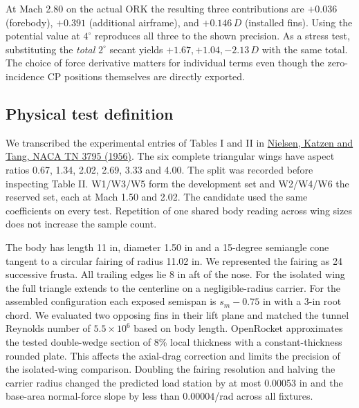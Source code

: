 At Mach 2.80 on the actual ORK the resulting three contributions are $+0.036$ (forebody), $+0.391$ (additional airframe), and $+0.146\,D$ (installed fins). Using the potential value at $4^\circ$ reproduces all three to the shown precision. As a stress test, substituting the \emph{total} $2^\circ$ secant yields $+1.67,+1.04,-2.13\,D$ with the same total. The choice of force derivative matters for individual terms even though the zero-incidence CP positions themselves are directly exported.


\clearpage\subsection*{Physical test definition}
We transcribed the experimental entries of Tables I and II in \href{https://ntrs.nasa.gov/citations/19930084523}{Nielsen, Katzen and Tang, NACA TN 3795 (1956)}. The six complete triangular wings have aspect ratios 0.67, 1.34, 2.02, 2.69, 3.33 and 4.00. The split was recorded before inspecting Table II. W1/W3/W5 form the development set and W2/W4/W6 the reserved set, each at Mach 1.50 and 2.02. The candidate used the same coefficients on every test. Repetition of one shared body reading across wing sizes does not increase the sample count.

The body has length 11 in, diameter 1.50 in and a 15-degree semiangle cone tangent to a circular fairing of radius 11.02 in. We represented the fairing as 24 successive frusta. All trailing edges lie 8 in aft of the nose. For the isolated wing the full triangle extends to the centerline on a negligible-radius carrier. For the assembled configuration each exposed semispan is $s_m-0.75$ in with a 3-in root chord. We evaluated two opposing fins in their lift plane and matched the tunnel Reynolds number of $5.5\times10^6$ based on body length. OpenRocket approximates the tested double-wedge section of 8\% local thickness with a constant-thickness rounded plate. This affects the axial-drag correction and limits the precision of the isolated-wing comparison. Doubling the fairing resolution and halving the carrier radius changed the predicted load station by at most 0.00053 in and the base-area normal-force slope by less than 0.00004/rad across all fixtures.

